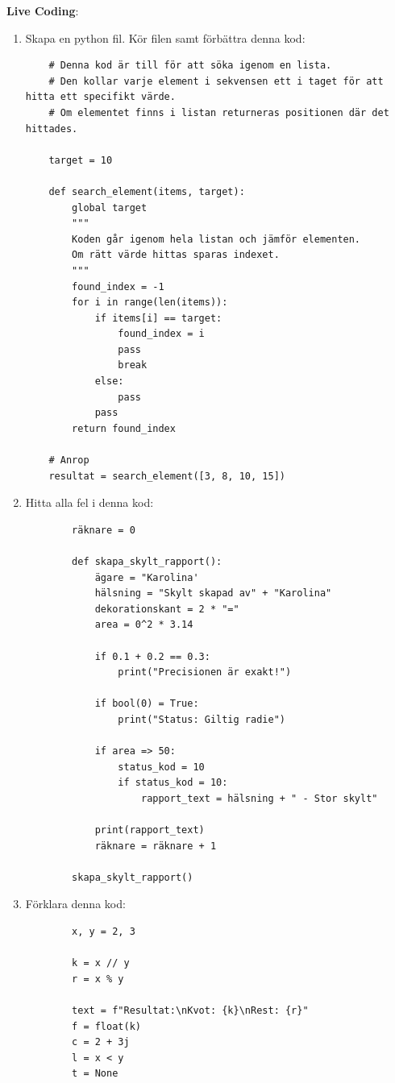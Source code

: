 \documentclass[11pt,a4paper]{article}
\begin{document}
\textbf{Live Coding}:
\begin{enumerate}
    \item Skapa en python fil. Kör filen samt förbättra denna kod:
    \begin{lstlisting}
    # Denna kod är till för att söka igenom en lista.
    # Den kollar varje element i sekvensen ett i taget för att hitta ett specifikt värde.
    # Om elementet finns i listan returneras positionen där det hittades.

    target = 10

    def search_element(items, target):
        global target
        """
        Koden går igenom hela listan och jämför elementen.
        Om rätt värde hittas sparas indexet.
        """
        found_index = -1
        for i in range(len(items)):
            if items[i] == target:
                found_index = i
                pass
                break
            else:
                pass
            pass
        return found_index

    # Anrop
    resultat = search_element([3, 8, 10, 15])
    \end{lstlisting}
    \item Hitta alla fel i denna kod:
    \begin{lstlisting}
        räknare = 0

        def skapa_skylt_rapport():
            ägare = "Karolina'
            hälsning = "Skylt skapad av" + "Karolina"
            dekorationskant = 2 * "="
            area = 0^2 * 3.14
            
            if 0.1 + 0.2 == 0.3:
                print("Precisionen är exakt!")
                
            if bool(0) = True: 
                print("Status: Giltig radie")
                
            if area => 50:
                status_kod = 10
                if status_kod = 10:
                    rapport_text = hälsning + " - Stor skylt"
                    
            print(rapport_text)
            räknare = räknare + 1

        skapa_skylt_rapport()
    \end{lstlisting}
    \item Förklara denna kod:
    \begin{lstlisting}
        x, y = 2, 3

        k = x // y
        r = x % y

        text = f"Resultat:\nKvot: {k}\nRest: {r}"
        f = float(k)
        c = 2 + 3j
        l = x < y
        t = None


\end{lstlisting}
\end{enumerate}
\end{document}
